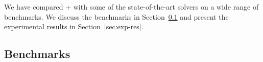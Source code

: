 
We have compared {\ostrich}+ with some of the state-of-the-art solvers on a wide range of benchmarks.  
We  discuss the benchmarks in Section~\ref{sec:bench} and %
present the experimental results in Section~\ref{sec:exp-res}.



\subsection{Benchmarks}\label{sec:bench}
 

%
%
%
%
%

